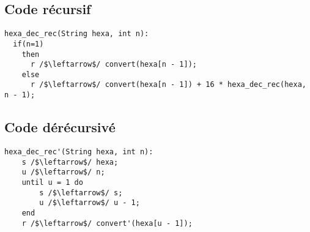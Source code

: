 \documentclass[a4paper, 11pt, oneside]{article}
\begin{document}
\subsection{Code récursif}

\lstset{escapeinside=//}
\begin{lstlisting}[language=Algol]
hexa_dec_rec(String hexa, int n):
  if(n=1)
    then 
      r /$\leftarrow$/ convert(hexa[n - 1]);
    else
      r /$\leftarrow$/ convert(hexa[n - 1]) + 16 * hexa_dec_rec(hexa, n - 1);
\end{lstlisting}

\subsection{Code dérécursivé}

\begin{lstlisting}[language=Custom]
hexa_dec_rec'(String hexa, int n):
    s /$\leftarrow$/ hexa;
    u /$\leftarrow$/ n;
    until u = 1 do
        s /$\leftarrow$/ s;
        u /$\leftarrow$/ u - 1;
    end
    r /$\leftarrow$/ convert'(hexa[u - 1]);
\end{lstlisting}
\end{document}
